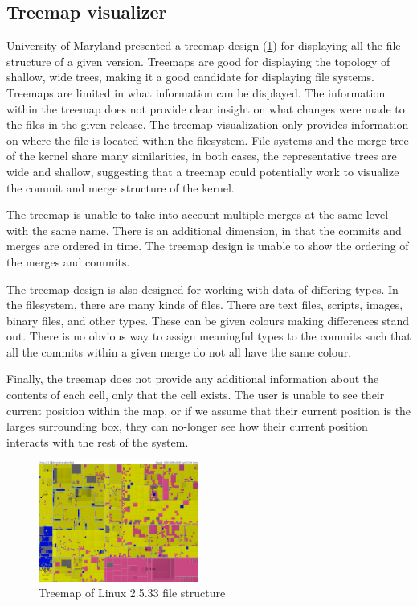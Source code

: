 \documentclass[conference, draftclsnofoot]{IEEEtran}
\begin{document}

\subsection{Treemap visualizer}
University of Maryland presented a treemap design (\ref{fig:treemap}) for
displaying all the file structure of a given version. Treemaps are good for
displaying the topology of shallow, wide trees, making it a good candidate for
displaying file systems. Treemaps are limited in what information can be
displayed. The information within the treemap does not provide clear insight on
what changes were made to the files in the given release. The treemap
visualization only provides information on where the file is located within the
filesystem. File systems and the merge tree of the kernel share many
similarities, in both cases, the representative trees are wide and shallow,
suggesting that a treemap could potentially work to visualize the commit and
merge structure of the kernel.

The treemap is unable to take into account multiple merges at the same level
with the same name. There is an additional dimension, in that the commits and
merges are ordered in time. The treemap design is unable to show the ordering
of the merges and commits.

The treemap design is also designed for working with data of differing types.
In the filesystem, there are many kinds of files.  There are text files,
scripts, images, binary files, and other types. These can be given colours
making differences stand out. There is no obvious way to assign meaningful
types to the commits such that all the commits within a given merge do not all
have the same colour.

Finally, the treemap does not provide any additional information about the
contents of each cell, only that the cell exists. The user is unable to see
their current position within the map, or if we assume that their current
position is the larges surrounding box, they can no-longer see how their
current position interacts with the rest of the system.

\begin{figure}[h!]
	\centering
	\includegraphics[width=0.47\textwidth]{figures/kernel-files.png}
	\caption{Treemap of Linux 2.5.33 file structure}
	\label{fig:treemap}
\end{figure}
\end{document}
